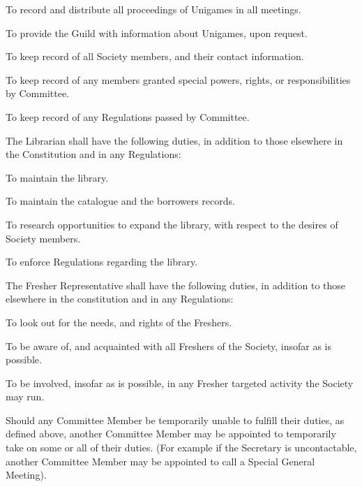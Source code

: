 \documentclass[a4paper]{article}
\begin{document}
\begin{myEnumerate}
              \begin{myEnumerate}
                  \item To record and distribute all proceedings of Unigames in all meetings.
                  \item To provide the Guild with information about Unigames, upon request.
                  \item To keep record of all Society members, and their contact information.
                  \item To keep record of any members granted special powers, rights, or responsibilities by Committee.
                  \item To keep record of any Regulations passed by Committee.
              \end{myEnumerate}
        \item The Librarian shall have the following duties, in addition to those elsewhere in the Constitution and in any Regulations:
              \begin{myEnumerate}
                  \item To maintain the library.
                  \item To maintain the catalogue and the borrowers records.
                  \item To research opportunities to expand the library, with respect to the desires of Society members.
                  \item To enforce Regulations regarding the library.
              \end{myEnumerate}
        \item The Fresher Representative shall have the following duties, in addition to those elsewhere in the constitution and in any Regulations:
              \begin{myEnumerate}
                  \item To look out for the needs, and rights of the Freshers.
                  \item To be aware of, and acquainted with all Freshers of the Society, insofar as is possible.
                  \item To be involved, insofar as is possible, in any Fresher targeted activity the Society may run.
              \end{myEnumerate}
        \item Should any Committee Member be temporarily unable to fulfill their duties, as defined above, another Committee Member may be appointed to temporarily take on some or all of their duties. (For example if the Secretary is uncontactable, another Committee Member may be appointed to call a Special General Meeting).
    \end{myEnumerate}
\end{document}
